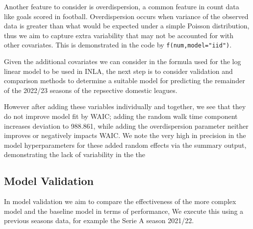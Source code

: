 \documentclass[
]{article}
\begin{document}
Another feature to consider is overdispersion, a common feature in count
data like goals scored in football. Overdispersion occurs when variance
of the observed data is greater than what would be expected under a
simple Poisson distribution, thus we aim to capture extra variability
that may not be accounted for with other covariates. This is
demonstrated in the code by \texttt{f(num,model="iid")}.

Given the additional covariates we can consider in the formula used for
the log linear model to be used in INLA, the next step is to consider
validation and comparison methods to determine a suitable model for
predicting the remainder of the 2022/23 seasons of the repsective
domestic leagues.

However after adding these variables individually and together, we see
that they do not improve model fit by WAIC; adding the random walk time
component increases deviation to 988.861, while adding the
overdispersion parameter neither improves or negatively impacts WAIC. We
note the very high in precision in the model hyperparameters for these
added random effects via the summary output, demonstrating the lack of
variability in the the

\hypertarget{model-validation}{%
\subsection{Model Validation}\label{model-validation}}

In model validation we aim to compare the effectiveness of the more
complex model and the baseline model in terms of performance, We execute
this using a previous seasons data, for example the Serie A season
2021/22.
\end{document}
